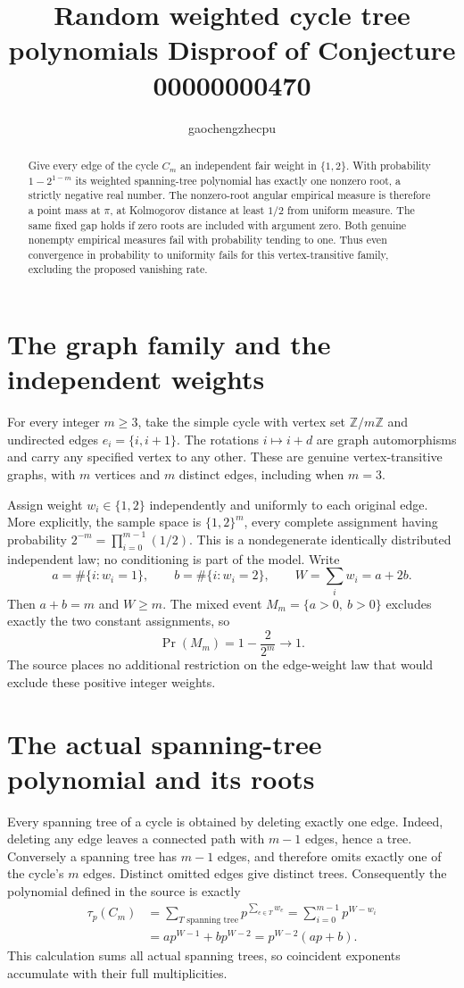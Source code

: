 \documentclass[11pt]{article}
\title{Random weighted cycle tree polynomials\newline
\large Disproof of Conjecture 00000000470}
\author{gaochengzhecpu}\date{}
\begin{document}
\maketitle
\begin{abstract}
Give every edge of the cycle $C_m$ an independent fair weight
in $\{1,2\}$. With probability $1-2^{1-m}$ its weighted
spanning-tree polynomial has exactly one nonzero root, a
strictly negative real number. The nonzero-root angular
empirical measure is therefore a point mass at $\pi$, at
Kolmogorov distance at least $1/2$ from uniform measure.
The same fixed gap holds if zero roots are included with
argument zero. Both genuine nonempty empirical measures
fail with probability tending to one. Thus even convergence
in probability to uniformity fails for this vertex-transitive
family, excluding the proposed vanishing rate.
\end{abstract}

\section*{The graph family and the independent weights}
For every integer $m\geq3$, take the simple cycle with vertex
set $\mathbb Z/m\mathbb Z$ and undirected edges
$e_i=\{i,i+1\}$. The rotations $i\mapsto i+d$ are graph
automorphisms and carry any specified vertex to any other.
These are genuine vertex-transitive graphs, with $m$ vertices
and $m$ distinct edges, including when $m=3$.

Assign weight $w_i\in\{1,2\}$ independently and uniformly
to each original edge. More explicitly, the sample space is
$\{1,2\}^{m}$, every complete assignment having probability
$2^{-m}=\prod_{i=0}^{m-1}(1/2)$. This is a nondegenerate
identically distributed independent law; no conditioning is
part of the model. Write
\[
 a=\#\{i:w_i=1\},\qquad b=\#\{i:w_i=2\},\qquad
 W=\sum_i w_i=a+2b.
\]
Then $a+b=m$ and $W\geq m$. The mixed event
$M_m=\{a>0,\ b>0\}$ excludes exactly the two constant
assignments, so
\[
                 \Pr(M_m)=1-\frac{2}{2^m}\longrightarrow1.
\]
The source places no additional restriction on the edge-weight
law that would exclude these positive integer weights.

\newpage
\section*{The actual spanning-tree polynomial and its roots}
Every spanning tree of a cycle is obtained by deleting
exactly one edge. Indeed, deleting any edge leaves a connected
path with $m-1$ edges, hence a tree. Conversely a spanning tree
has $m-1$ edges, and therefore omits exactly one of the
cycle's $m$ edges. Distinct omitted edges give distinct trees.
Consequently the polynomial defined in the source is exactly
\begin{align*}
 \tau_p(C_m)&=\sum_{T\text{ spanning tree}}p^{\sum_{e\in T}w_e}
          =\sum_{i=0}^{m-1}p^{W-w_i}\\
          &=a p^{W-1}+b p^{W-2}
           =p^{W-2}(ap+b).
\end{align*}
This calculation sums all actual spanning trees, so coincident
exponents accumulate with their full multiplicities.
\end{document}
